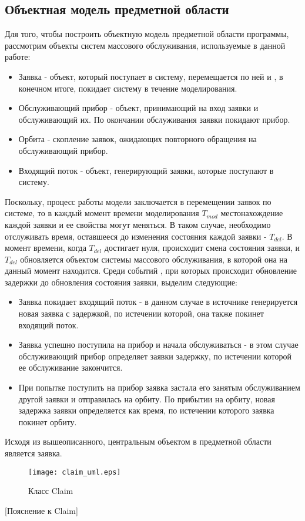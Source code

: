 \subsection {Объектная модель предметной области}
Для того, чтобы построить объектную модель предметной области программы, рассмотрим  объекты систем массового обслуживания, используемые в данной работе:
\begin{itemize}
\item Заявка - объект, который поступает в систему, перемещается по ней и , в конечном итоге, покидает систему в течение моделирования.
\item Обслуживающий прибор - объект, принимающий на вход заявки и обслуживающий их. По окончании обслуживания заявки покидают прибор.
\item Орбита - скопление заявок, ожидающих повторного обращения на обслуживающий прибор.
\item Входящий поток - объект, генерирующий заявки, которые поступают в систему.
	\end{itemize}
 Поскольку, процесс работы модели заключается в перемещении заявок по системе, то в каждый момент времени моделирования $T_{mod}$ местонахождение каждой заявки и ее свойства могут меняться. В таком случае, необходимо отслуживать время, оставшееся до изменения состояния каждой заявки - $T_{del}$. В момент времени, когда $T_{del}$ достигает нуля,  происходит смена состояния заявки, и  $T_{del}$ обновляется объектом системы массового обслуживания, в которой она на данный момент находится. Среди событий , при которых происходит обновление задержки до обновления состояния заявки, выделим следующие:
\begin{itemize}
	\item Заявка покидает входящий поток - в данном случае в источнике генерируется новая заявка с задержкой, по истечении которой, она также покинет входящий поток.
	\item Заявка успешно поступила на прибор и начала обслуживаться - в этом случае обслуживающий прибор определяет заявки задержку, по истечении которой ее обслуживание закончится.
	\item При попытке поступить на прибор заявка застала его занятым обслуживанием другой заявки и отправилась на орбиту. По прибытии на орбиту, новая задержка заявки определяется как время, по истечении которого заявка покинет орбиту.
\end{itemize}
Исходя из вышеописанного, центральным объектом в предметной области является заявка.
\begin{figure}[H]
	\centering
	\texttt{[image: claim\_uml.eps]}
	\caption{Класс Claim}
	\label{claim_uml}
\end{figure}
[Пояснение к Claim]

